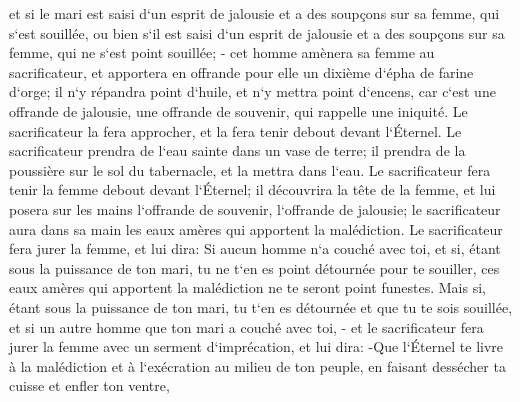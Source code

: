 \verse et si le mari est saisi d`un esprit de jalousie et a des soupçons sur sa femme, qui s`est souillée, ou bien s`il est saisi d`un esprit de jalousie et a des soupçons sur sa femme, qui ne s`est point souillée; - 
\verse cet homme amènera sa femme au sacrificateur, et apportera en offrande pour elle un dixième d`épha de farine d`orge; il n`y répandra point d`huile, et n`y mettra point d`encens, car c`est une offrande de jalousie, une offrande de souvenir, qui rappelle une iniquité. 
\verse Le sacrificateur la fera approcher, et la fera tenir debout devant l`Éternel. 
\verse Le sacrificateur prendra de l`eau sainte dans un vase de terre; il prendra de la poussière sur le sol du tabernacle, et la mettra dans l`eau. 
\verse Le sacrificateur fera tenir la femme debout devant l`Éternel; il découvrira la tête de la femme, et lui posera sur les mains l`offrande de souvenir, l`offrande de jalousie; le sacrificateur aura dans sa main les eaux amères qui apportent la malédiction. 
\verse Le sacrificateur fera jurer la femme, et lui dira: Si aucun homme n`a couché avec toi, et si, étant sous la puissance de ton mari, tu ne t`en es point détournée pour te souiller, ces eaux amères qui apportent la malédiction ne te seront point funestes. 
\verse Mais si, étant sous la puissance de ton mari, tu t`en es détournée et que tu te sois souillée, et si un autre homme que ton mari a couché avec toi, - 
\verse et le sacrificateur fera jurer la femme avec un serment d`imprécation, et lui dira: -Que l`Éternel te livre à la malédiction et à l`exécration au milieu de ton peuple, en faisant dessécher ta cuisse et enfler ton ventre, 

